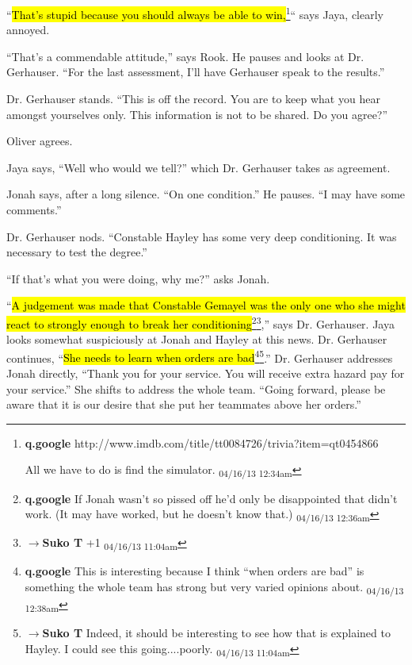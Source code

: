 ``\hl{That's stupid because you should always be able to win,}\footnote{\textbf{q.google }http://www.imdb.com/title/tt0084726/trivia?item=qt0454866

All we have to do is find the simulator. \textsubscript{04/16/13 12:34am}}`` says Jaya, clearly annoyed.

``That's a commendable attitude,'' says Rook.  He pauses and looks at Dr. Gerhauser.  ``For the last assessment, I'll have Gerhauser speak to the results.''



Dr. Gerhauser stands.  ``This is off the record.  You are to keep what you hear amongst yourselves only.  This information is not to be shared.  Do you agree?''

Oliver agrees.

Jaya says, ``Well who would we tell?'' which Dr. Gerhauser takes as agreement.

Jonah says, after a long silence.  ``On one condition.''  He pauses.  ``I may have some comments.''



Dr. Gerhauser nods.  ``Constable Hayley has some very deep conditioning.  It was necessary to test the degree.''

``If that's what you were doing, why me?'' asks Jonah.

``\hl{A judgement was made that Constable Gemayel was the only one who she might react to strongly enough to break her conditioning}\footnote{\textbf{q.google }If Jonah wasn't so pissed off he'd only be disappointed that didn't work.  (It may have worked, but he doesn't know that.) \textsubscript{04/16/13 12:36am}}\footnote{$\rightarrow$\textbf{Suko T }+1 \textsubscript{04/16/13 11:04am}},'' says Dr. Gerhauser.  Jaya looks somewhat suspiciously at Jonah and Hayley at this news.  Dr. Gerhauser continues, ``\hl{She needs to learn when orders are bad}\footnote{\textbf{q.google }This is interesting because I think ``when orders are bad'' is something the whole team has strong but very varied opinions about. \textsubscript{04/16/13 12:38am}}\footnote{$\rightarrow$\textbf{Suko T }Indeed, it should be interesting to see how that is explained to Hayley.  I could see this going....poorly. \textsubscript{04/16/13 11:04am}}.''  Dr. Gerhauser addresses Jonah directly, ``Thank you for your service.  You will receive extra hazard pay for your service.''  She shifts to address the whole team.  ``Going forward, please be aware that it is our desire that she put her teammates above her orders.''

